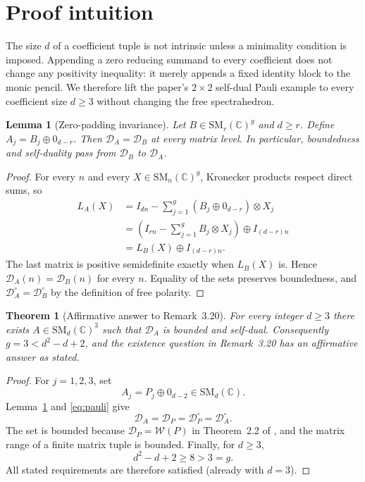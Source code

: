 \documentclass[10pt]{article}
\newtheorem{theorem}{Theorem}
\newtheorem{lemma}{Lemma}
\newcommand{\D}{\mathcal D}
\newcommand{\W}{\mathcal W}
\newcommand{\SM}{\mathrm{SM}}
\newcommand{\C}{\mathbb C}
\begin{document}
\section*{Proof intuition}

The size $d$ of a coefficient tuple is not intrinsic unless a minimality
condition is imposed.  Appending a zero reducing summand to every coefficient
does not change any positivity inequality: it merely appends a fixed identity
block to the monic pencil.  We therefore lift the paper's $2\times2$
self-dual Pauli example to every coefficient size $d\geq3$ without changing
the free spectrahedron.

\begin{lemma}[Zero-padding invariance]\label{lem:padding}
Let $B\in\SM_r(\C)^g$ and $d\geq r$.  Define
$A_j=B_j\oplus0_{d-r}$.  Then $\D_A=\D_B$ at every matrix level.  In
particular, boundedness and self-duality pass from $\D_B$ to $\D_A$.
\end{lemma}

\begin{proof}
For every $n$ and every $X\in\SM_n(\C)^g$, Kronecker products respect direct
sums, so
\begin{align*}
 L_A(X)
 &=I_{dn}-\sum_{j=1}^g(B_j\oplus0_{d-r})\otimes X_j\\
 &=\left(I_{rn}-\sum_{j=1}^gB_j\otimes X_j\right)
   \oplus I_{(d-r)n}\\
 &=L_B(X)\oplus I_{(d-r)n}.
\end{align*}
The last matrix is positive semidefinite exactly when $L_B(X)$ is.  Hence
$\D_A(n)=\D_B(n)$ for every $n$.  Equality of the sets preserves boundedness,
and $\D_A^\circ=\D_B^\circ$ by the definition of free polarity.
\end{proof}

\begin{theorem}[Affirmative answer to Remark~3.20]\label{thm:answer}
For every integer $d\geq3$ there exists
$A\in\SM_d(\C)^3$ such that $\D_A$ is bounded and self-dual.  Consequently
$g=3<d^2-d+2$, and the existence question in Remark~3.20 has an affirmative
answer as stated.
\end{theorem}

\begin{proof}
For $j=1,2,3$, set
\[
 A_j=P_j\oplus0_{d-2}\in\SM_d(\C).
\]
Lemma~\ref{lem:padding} and \eqref{eq:pauli} give
\[
 \D_A=\D_P=\D_P^\circ=\D_A^\circ.
\]
The set is bounded because $\D_P=\W(P)$ in Theorem~2.2 of \cite{EP}, and the
matrix range of a finite matrix tuple is bounded.  Finally, for $d\geq3$,
\[
 d^2-d+2\geq8>3=g.
\]
All stated requirements are therefore satisfied (already with $d=3$).
\end{proof}
\end{document}

